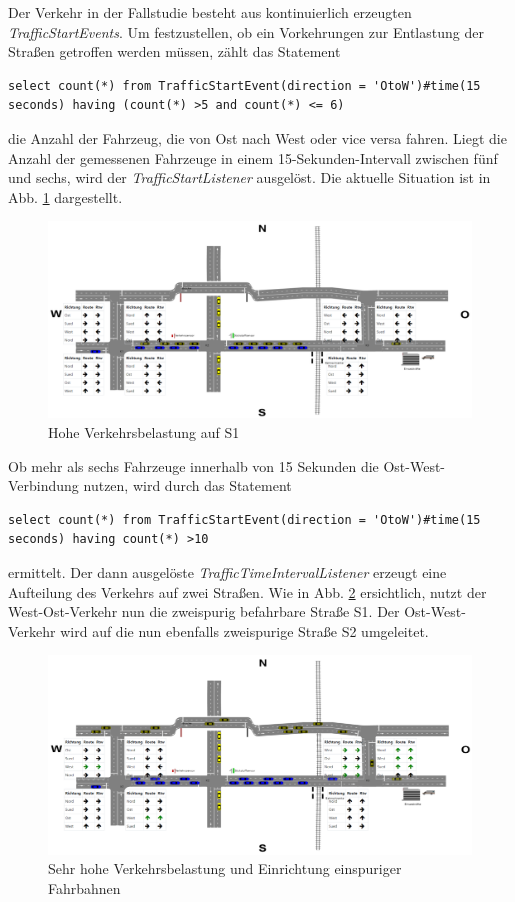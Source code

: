 Der Verkehr in der Fallstudie besteht aus kontinuierlich erzeugten \textit{TrafficStartEvents}. Um festzustellen, ob ein Vorkehrungen zur Entlastung der Straßen getroffen werden müssen, zählt das Statement

\begin{lstlisting}
select count(*) from TrafficStartEvent(direction = 'OtoW')#time(15 seconds) having (count(*) >5 and count(*) <= 6)
\end{lstlisting}

die Anzahl der Fahrzeug, die von Ost nach West oder vice versa fahren. Liegt die Anzahl der gemessenen Fahrzeuge in einem 15-Sekunden-Intervall zwischen fünf und sechs, wird der \textit{TrafficStartListener} ausgelöst. Die aktuelle Situation ist in Abb. \ref{fig10} dargestellt.

\begin{figure}[ht]
	\includegraphics[width=\textwidth]{images/TrafficHigh.png}
	\caption{Hohe Verkehrsbelastung auf S1}
	\label{fig10}
\end{figure}


Ob mehr als sechs Fahrzeuge innerhalb von 15 Sekunden die Ost-West-Verbindung nutzen, wird durch das Statement
\begin{lstlisting}
select count(*) from TrafficStartEvent(direction = 'OtoW')#time(15 seconds) having count(*) >10
\end{lstlisting}
ermittelt. Der dann ausgelöste \textit{TrafficTimeIntervalListener} erzeugt eine Aufteilung des Verkehrs auf zwei Straßen. Wie in Abb. \ref{fig11} ersichtlich, nutzt der West-Ost-Verkehr nun die zweispurig befahrbare Straße S1. Der Ost-West-Verkehr wird auf die nun ebenfalls zweispurige Straße S2 umgeleitet. 

\begin{figure}[ht]
	\includegraphics[width=\textwidth]{images/TrafficVeryHigh.png}
	\caption{Sehr hohe Verkehrsbelastung und Einrichtung einspuriger Fahrbahnen}
	\label{fig11}
\end{figure}

